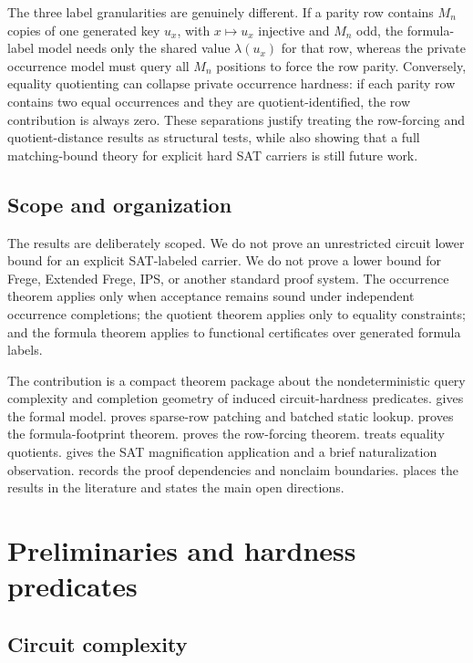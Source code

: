 \documentclass[11pt]{article}
\theoremstyle{definition}
\begin{document}
The three label granularities are genuinely different.  If a parity row contains \(M_n\) copies of one generated key \(u_x\), with \(x\mapsto u_x\) injective and \(M_n\) odd, the formula-label model needs only the shared value \(\lambda(u_x)\) for that row, whereas the private occurrence model must query all \(M_n\) positions to force the row parity.  Conversely, equality quotienting can collapse private occurrence hardness: if each parity row contains two equal occurrences and they are quotient-identified, the row contribution is always zero.  These separations justify treating the row-forcing and quotient-distance results as structural tests, while also showing that a full matching-bound theory for explicit hard SAT carriers is still future work.

\subsection{Scope and organization}

The results are deliberately scoped.  We do not prove an unrestricted circuit lower bound for an explicit SAT-labeled carrier.  We do not prove a lower bound for Frege, Extended Frege, IPS, or another standard proof system.  The occurrence theorem applies only when acceptance remains sound under independent occurrence completions; the quotient theorem applies only to equality constraints; and the formula theorem applies to functional certificates over generated formula labels.

The contribution is a compact theorem package about the nondeterministic query complexity and completion geometry of induced circuit-hardness predicates.   gives the formal model.   proves sparse-row patching and batched static lookup.   proves the formula-footprint theorem.   proves the row-forcing theorem.   treats equality quotients.   gives the SAT magnification application and a brief naturalization observation.   records the proof dependencies and nonclaim boundaries.   places the results in the literature and states the main open directions.

\section{Preliminaries and hardness predicates}\label{sec:prelim}

\subsection{Circuit complexity}
\end{document}
